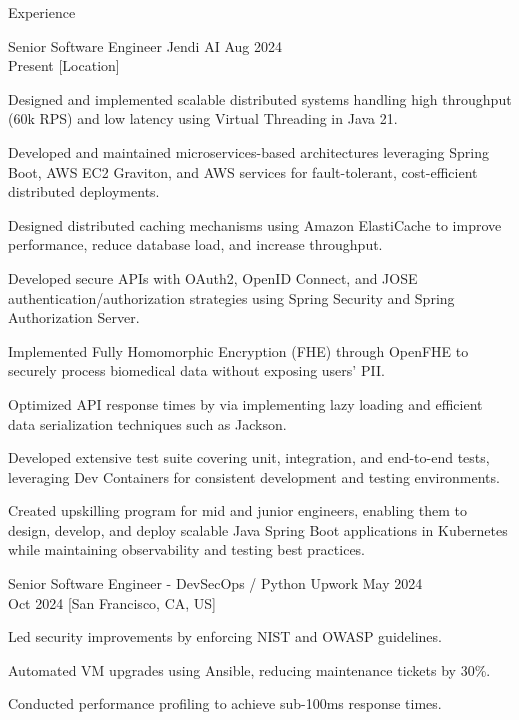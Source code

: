 \begin{rSection}{Experience}
    \begin{rSubsection}
        {Senior Software Engineer}
        {Jendi AI}
        {Aug 2024 \\ Present}
        [Location]
        \begin{rItemize}
            \item Designed and implemented scalable distributed systems handling high throughput (60k RPS) and low latency using Virtual Threading in Java 21.
            \item Developed and maintained microservices-based architectures leveraging Spring Boot, AWS EC2 Graviton, and AWS services for fault-tolerant, cost-efficient distributed deployments.
            \item Designed distributed caching mechanisms using Amazon ElastiCache to improve performance, reduce database load, and increase throughput.
            \item Developed secure APIs with OAuth2, OpenID Connect, and JOSE authentication/authorization strategies using Spring Security and Spring Authorization Server.
            \item Implemented Fully Homomorphic Encryption (FHE) through OpenFHE to securely process biomedical data without exposing users' PII.
            \item Optimized API response times by %
            via implementing lazy loading and efficient data serialization techniques such as Jackson.
            \item Developed extensive test suite covering unit, integration, and end-to-end tests, leveraging Dev Containers for consistent development and testing environments.
            \item Created upskilling program for mid and junior engineers, enabling them to design, develop, and deploy scalable Java Spring Boot applications in Kubernetes while maintaining observability and testing best practices.
        \end{rItemize}
    \end{rSubsection}

    \begin{rSubsection}
        {Senior Software Engineer - DevSecOps / Python}
        {Upwork}
        {May 2024 \\ Oct 2024}
        [San Francisco, CA, US]
        \begin{rItemize}
            \item Led security improvements by enforcing NIST and OWASP guidelines.
            \item Automated VM upgrades using Ansible, reducing maintenance tickets by 30\%.
            \item Conducted performance profiling to achieve sub-100ms response times.
        \end{rItemize}
    \end{rSubsection}


\end{rSection}
